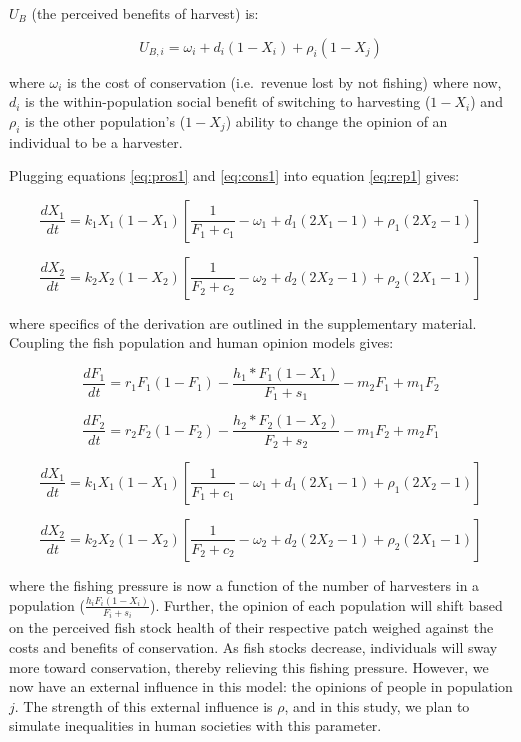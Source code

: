 \documentclass[
]{article}
\begin{document}
\(U_B\) (the perceived benefits of harvest) is:

\begin{equation} 
U_{B,i} = \omega_i + d_i(1-X_i) + \rho_i(1-X_j)
  \label{eq:cons1}
\end{equation}

where \(\omega_i\) is the cost of conservation (i.e.~revenue lost by not fishing) where now, \(d_i\) is the within-population social benefit of switching to harvesting (\(1-X_i\)) and \(\rho_i\) is the other population's (\(1-X_j\)) ability to change the opinion of an individual to be a harvester.

Plugging equations \eqref{eq:pros1} and \eqref{eq:cons1} into equation \eqref{eq:rep1} gives:

\begin{equation} 
\frac{dX_1}{dt} =  k_1X_1(1-X_1) [\frac{1}{F_1+c_1} - \omega_1 + d_1(2X_1 - 1) + \rho_1(2X_2 - 1)]
  \label{eq:social1}
\end{equation}

\begin{equation} 
\frac{dX_2}{dt} = k_2X_2(1-X_2)  [\frac{1}{F_2+c_2} - \omega_2 + d_2(2X_2 - 1) +  \rho_2(2X_1 - 1)]
  \label{eq:social2}
\end{equation}

where specifics of the derivation are outlined in the supplementary material. Coupling the fish population and human opinion models gives:

\begin{equation}
\frac{dF_1}{dt} = r_1F_1(1-F_1)-\frac{h_1*F_1(1-X_1)}{F_1 + s_1} -m_2F_1 + m_1F_2
  \label{eq:FishWhole1}
\end{equation}

\begin{equation}
\frac{dF_2}{dt} = r_2F_2(1-F_2)-\frac{h_2*F_2(1-X_2)}{F_2 + s_2} -m_1F_2 + m_2F_1
  \label{eq:FishWhole2}
\end{equation}

\begin{equation}
\frac{dX_1}{dt} =  k_1X_1(1-X_1) [\frac{1}{F_1+c_1} - \omega_1 + d_1(2X_1 - 1) + \rho_1(2X_2 - 1)]
  \label{eq:SocWhole1}
\end{equation}

\begin{equation}
\frac{dX_2}{dt} = k_2X_2(1-X_2)  [\frac{1}{F_2+c_2} - \omega_2 + d_2(2X_2 - 1) +  \rho_2(2X_1 - 1)]
  \label{eq:SocWhole2}
\end{equation}

where the fishing pressure is now a function of the number of harvesters in a population (\(\frac{h_iF_i(1-X_i)}{F_i + s_i}\)). Further, the opinion of each population will shift based on the perceived fish stock health of their respective patch weighed against the costs and benefits of conservation. As fish stocks decrease, individuals will sway more toward conservation, thereby relieving this fishing pressure. However, we now have an external influence in this model: the opinions of people in population \(j\). The strength of this external influence is \(\rho\), and in this study, we plan to simulate inequalities in human societies with this parameter.
\end{document}
